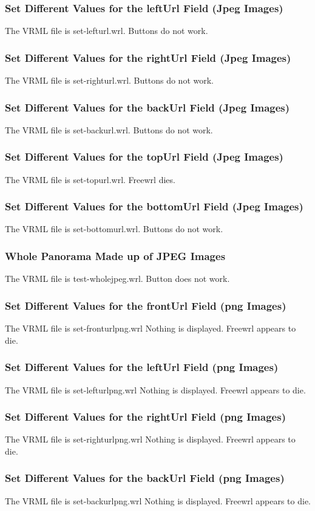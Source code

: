 \documentclass[12pt,letterpaper]{article}
\newcommand{\BkgI}{Set Different Values for the leftUrl Field (Jpeg Images)}
\newcommand{\BkgJ}{Set Different Values for the rightUrl Field (Jpeg Images)}
\newcommand{\BkgK}{Set Different Values for the backUrl Field (Jpeg Images)}
\newcommand{\BkgL}{Set Different Values for the topUrl Field (Jpeg Images)}
\newcommand{\BkgM}{Set Different Values for the bottomUrl Field (Jpeg Images)}
\newcommand{\BkgN}{Whole Panorama Made up of JPEG Images}
\newcommand{\BkgO}{Set Different Values for the frontUrl Field (png Images)}
\newcommand{\BkgP}{Set Different Values for the leftUrl Field (png Images)}
\newcommand{\BkgQ}{Set Different Values for the rightUrl Field (png Images)}
\newcommand{\BkgR}{Set Different Values for the backUrl Field (png Images)}
\begin{document}
\subsubsection{\BkgI}
The VRML file is set-lefturl.wrl.
Buttons do not work.

\subsubsection{\BkgJ}
The VRML file is set-righturl.wrl.
Buttons do not work.

\subsubsection{\BkgK}
The VRML file is set-backurl.wrl.
Buttons do not work.

\subsubsection{\BkgL}
The VRML file is set-topurl.wrl.
Freewrl dies.

\subsubsection{\BkgM}
The VRML file is set-bottomurl.wrl.
Buttons do not work.

\subsubsection{\BkgN}
The VRML file is test-wholejpeg.wrl.
Button does not work.

\subsubsection{\BkgO}
The VRML file is set-fronturlpng.wrl
Nothing is displayed. Freewrl appears to die.

\subsubsection{\BkgP}
The VRML file is set-lefturlpng.wrl
Nothing is displayed. Freewrl appears to die.

\subsubsection{\BkgQ}
The VRML file is set-righturlpng.wrl
Nothing is displayed. Freewrl appears to die.

\subsubsection{\BkgR}
The VRML file is set-backurlpng.wrl
Nothing is displayed. Freewrl appears to die.
\end{document}
